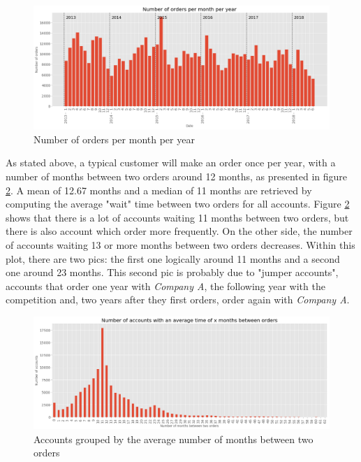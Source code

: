 \begin{figure}[h]
    \centering
    \includegraphics[width=15cm]{images/order_month_year.png}
    \caption{Number of orders per month per year}
    \label{fig:order_per_monthyear}
\end{figure}


As stated above, a typical customer will make an order once per year, with a number of months between two orders around 12 months, as presented in figure \ref{fig:orders-account-counts}. A mean of 12.67 months and a median of 11 months are retrieved by computing the average "wait" time between two orders for all accounts. Figure \ref{fig:orders-account-counts} shows that there is a lot of accounts waiting 11 months between two orders, but there is also account which order more frequently. On the other side, the number of accounts waiting 13 or more months between two orders decreases. Within this plot, there are two pics: the first one logically around 11 months and a second one around 23 months. This second pic is probably due to "jumper accounts", accounts that order one year with \textit{Company A}, the following year with the competition and, two years after they first orders, order again with \textit{Company A}. 

\begin{figure}[h]
    \centering
    \includegraphics[width=15cm]{images/accounts-average-time-orders.png}
    \caption[Average number of months between two orders]{Accounts grouped by the average number of months between two orders}
    \label{fig:orders-account-counts}
\end{figure}

